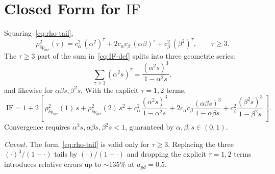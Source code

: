 \documentclass[11pt,a4paper]{ctexart}
\newcommand{\dpmr}{\delta p_{mr}}
\newcommand{\apd}{a_{pd}}
\newcommand{\IF}{\mathrm{IF}}
\newcommand{\rhodpmr}{\rho_{\dpmr}}
\begin{document}
\section{Closed Form for $\IF$}
\label{sec:IF-closed}

Squaring~\eqref{eq:rho-tail},
\begin{equation}
\rhodpmr^{2}(\tau) = c_{\alpha}^{2}\,(\alpha^{2})^{\tau} + 2c_{\alpha}c_{\beta}\,(\alpha\beta)^{\tau} + c_{\beta}^{2}\,(\beta^{2})^{\tau},\qquad \tau\ge 3.
\label{eq:rho-sq}
\end{equation}
The $\tau\ge 3$ part of the sum in~\eqref{eq:IF-def} splits into three geometric series:
\begin{equation}
\sum_{\tau\ge 3}(\alpha^{2}s)^{\tau} = \frac{(\alpha^{2}s)^{3}}{1-\alpha^{2}s},
\end{equation}
and likewise for $\alpha\beta s,\beta^{2}s$. With the explicit $\tau=1,2$ terms,
\begin{equation}
\boxed{\;
\IF = 1 + 2\!\left[\,
\rhodpmr^{2}(1)\,s + \rhodpmr^{2}(2)\,s^{2}
+ c_{\alpha}^{2}\frac{(\alpha^{2}s)^{3}}{1-\alpha^{2}s}
+ 2c_{\alpha}c_{\beta}\frac{(\alpha\beta s)^{3}}{1-\alpha\beta s}
+ c_{\beta}^{2}\frac{(\beta^{2}s)^{3}}{1-\beta^{2}s}
\,\right].
\;}
\label{eq:IF-closed}
\end{equation}
Convergence requires $\alpha^{2}s,\alpha\beta s,\beta^{2}s<1$, guaranteed by $\alpha,\beta,s\in(0,1)$.

\textit{Caveat.} The form~\eqref{eq:rho-tail} is valid only for $\tau\ge 3$. Replacing the three $(\cdot)^{3}/(1-\cdot)$ tails by $(\cdot)/(1-\cdot)$ and dropping the explicit $\tau=1,2$ terms introduces relative errors up to $\sim 135\%$ at $\apd=0.5$.
\end{document}
